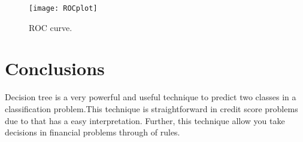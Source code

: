 \documentclass[a4paper, 10pt]{article}
\begin{document}
\begin{figure}[H]
	\centering 
	\texttt{[image: ROCplot]}
	\caption{\label{roc}ROC curve.}
\end{figure}

\section{Conclusions}

Decision tree is a very powerful and useful technique to predict two classes in a classification problem.This technique is straightforward in credit score problems due to that has a easy interpretation. Further, this technique allow you take decisions in financial problems through of rules. 
\end{document}
